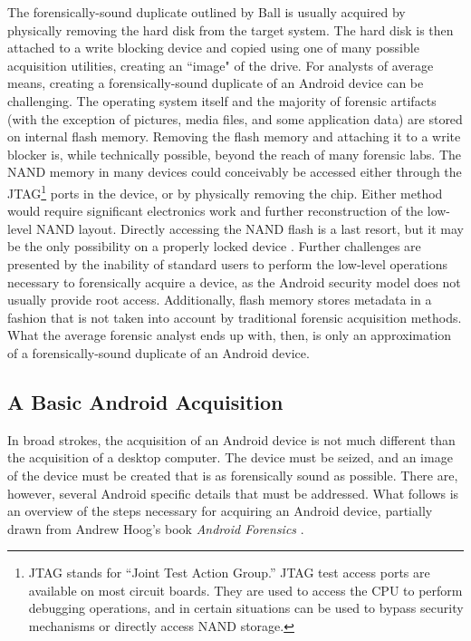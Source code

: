 The forensically-sound duplicate outlined by Ball is usually acquired by physically removing the hard disk from the target system.
The hard disk is then attached to a write blocking device and copied using one of many possible acquisition utilities, creating an
``image" of the drive. For analysts of average means, creating a forensically-sound duplicate of an Android device can be
challenging. The operating system itself and the majority of forensic artifacts (with the exception of pictures, media files, and
some application data) are stored on internal flash memory.  Removing the flash memory and attaching it to a write blocker is, while
technically possible, beyond the reach of many forensic labs.  The NAND memory in many devices could conceivably be accessed either
through the JTAG\footnote{JTAG stands for ``Joint Test Action Group.'' JTAG test access ports are available on most circuit boards.
They are used to access the CPU to perform debugging operations, and in certain situations can be used to bypass security mechanisms
or directly access NAND storage.} ports in the device, or by physically removing the chip.  Either method would require significant
electronics work and further reconstruction of the low-level NAND layout. Directly accessing the NAND flash is a last resort, but it
may be the only possibility on a properly locked device \cite{chipoff}.  Further challenges are presented by the inability of
standard users to perform the low-level operations necessary to forensically acquire a device, as the Android security model does
not usually provide root access.  Additionally, flash memory stores metadata in a fashion that is not taken into account by
traditional forensic acquisition methods.  What the average forensic analyst ends up with, then, is only an approximation of a
forensically-sound duplicate of an Android device. 

\subsection{A Basic Android Acquisition}

In broad strokes, the acquisition of an Android device is not much different than the acquisition of a desktop computer. 
The device must be seized, and an image of the device must be created that is as forensically sound as possible.  There are,
however, several Android specific details that must be addressed.  What follows is an overview of the steps necessary for acquiring
an Android device, partially drawn from Andrew Hoog's book \emph{Android Forensics} \cite{hoog}.

